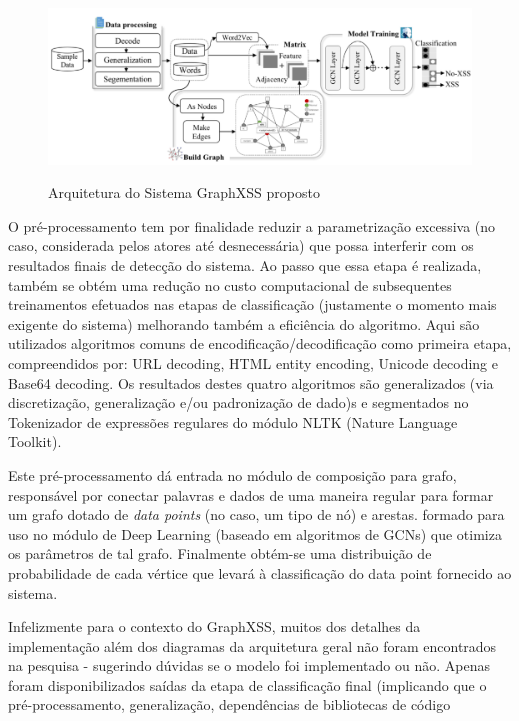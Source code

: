 \begin{figure}[ht]
    \centering
    \caption{Arquitetura do Sistema GraphXSS proposto}
    \includegraphics[width=14cm]{figuras/graphXSS.png} 
    \label{fig:internet} 
\end{figure}

O pré-processamento tem por finalidade reduzir a parametrização excessiva (no caso, considerada pelos atores até desnecessária) que possa interferir com os resultados finais de detecção do sistema. Ao passo que essa etapa é realizada, também se obtém uma redução no custo computacional de subsequentes treinamentos  efetuados nas etapas de classificação (justamente o momento mais exigente do sistema) melhorando também a eficiência do algoritmo. Aqui são utilizados algoritmos comuns de encodificação/decodificação como primeira etapa, compreendidos por: URL decoding, HTML entity encoding, Unicode decoding e Base64 decoding. Os resultados destes quatro algoritmos são generalizados (via discretização, generalização e/ou padronização de dado)s e segmentados no Tokenizador de expressões regulares do módulo NLTK (Nature Language Toolkit).

Este pré-processamento dá entrada no módulo de composição para grafo, responsável por conectar palavras e dados de uma maneira regular para formar um grafo dotado de \textit{data points} (no caso, um tipo de nó) e arestas. formado para uso no módulo de Deep Learning (baseado em algoritmos de GCNs) que otimiza os parâmetros de tal grafo. Finalmente obtém-se uma distribuição de probabilidade de cada vértice que levará à classificação do data point fornecido ao sistema. 

Infelizmente para o contexto do GraphXSS, muitos dos detalhes da implementação além dos diagramas da arquitetura geral não foram encontrados na pesquisa - sugerindo dúvidas se o modelo foi implementado ou não. Apenas foram disponibilizados saídas da etapa de classificação final (implicando que o pré-processamento, generalização, dependências de bibliotecas de código

